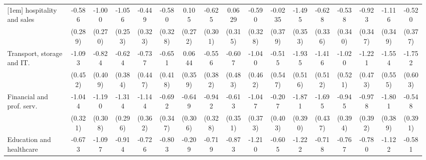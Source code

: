 {\begin{tabular}{l*{16}{c}}
[1em]
hospitality and sales&      -0.586\sym{*}  &      -1.000\sym{***}&      -1.056\sym{***}&      -0.449         &      -0.580         &       0.105         &      -0.625\sym{*}  &      0.0629         &      -0.590         &     -0.0235         &      -1.495\sym{***}&      -0.628         &      -0.538         &      -0.923\sym{**} &      -1.116\sym{**} &      -0.520         \\
                    &     (0.289)         &     (0.270)         &     (0.253)         &     (0.323)         &     (0.328)         &     (0.272)         &     (0.301)         &     (0.315)         &     (0.328)         &     (0.379)         &     (0.353)         &     (0.336)         &     (0.340)         &     (0.347)         &     (0.349)         &     (0.377)         \\
[1em]
Transport, storage and IT.&      -1.093\sym{*}  &      -0.824\sym{*}  &      -0.624         &      -0.737         &      -0.651         &      0.0644         &      -0.556         &      -0.607         &      -1.040\sym{*}  &      -0.515         &      -1.935\sym{***}&      -1.416\sym{**} &      -1.020         &      -1.221\sym{**} &      -1.554\sym{**} &      -1.752\sym{**} \\
                    &     (0.452)         &     (0.409)         &     (0.384)         &     (0.447)         &     (0.418)         &     (0.359)         &     (0.382)         &     (0.483)         &     (0.462)         &     (0.547)         &     (0.516)         &     (0.512)         &     (0.521)         &     (0.473)         &     (0.555)         &     (0.603)         \\
[1em]
Financial and prof. serv.&      -1.044\sym{**} &      -1.190\sym{***}&      -1.314\sym{***}&      -1.144\sym{**} &      -0.692\sym{*}  &      -0.649\sym{*}  &      -0.942\sym{**} &      -0.613         &      -1.047\sym{**} &      -0.207         &      -1.871\sym{***}&      -1.695\sym{***}&      -0.945\sym{*}  &      -0.978\sym{*}  &      -1.801\sym{***}&      -0.548         \\
                    &     (0.321)         &     (0.308)         &     (0.296)         &     (0.362)         &     (0.347)         &     (0.306)         &     (0.328)         &     (0.351)         &     (0.373)         &     (0.403)         &     (0.390)         &     (0.437)         &     (0.394)         &     (0.392)         &     (0.389)         &     (0.391)         \\
[1em]
Education and healthcare&      -0.673\sym{*}  &      -1.097\sym{***}&      -0.914\sym{**} &      -0.726\sym{*}  &      -0.803\sym{*}  &      -0.209         &      -0.719\sym{*}  &      -0.873\sym{*}  &      -1.210\sym{***}&      -0.605         &      -1.222\sym{***}&      -0.718         &      -0.767\sym{*}  &      -0.780\sym{*}  &      -1.122\sym{**} &      -0.581         \\

\end{tabular}}
